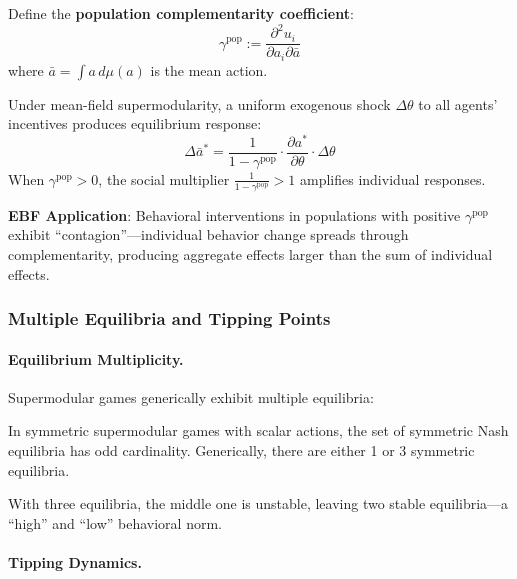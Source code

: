 Define the \textbf{population complementarity coefficient}:
\begin{equation}
\gamma^{\text{pop}} := \frac{\partial^2 u_i}{\partial a_i \partial \bar{a}}
\end{equation}
where $\bar{a} = \int a \, d\mu(a)$ is the mean action.

\begin{proposition}
\label{prop:multiplier}
Under mean-field supermodularity, a uniform exogenous shock $\Delta \theta$ to all 
agents' incentives produces equilibrium response:
\begin{equation}
\Delta \bar{a}^* = \frac{1}{1 - \gamma^{\text{pop}}} \cdot \frac{\partial a^*}{\partial \theta} \cdot \Delta\theta
\end{equation}
When $\gamma^{\text{pop}} > 0$, the social multiplier $\frac{1}{1-\gamma^{\text{pop}}} > 1$ 
amplifies individual responses.
\end{proposition}

\textbf{EBF Application}: Behavioral interventions in populations with positive 
$\gamma^{\text{pop}}$ exhibit ``contagion''---individual behavior change spreads 
through complementarity, producing aggregate effects larger than the sum of 
individual effects.

\subsubsection{Multiple Equilibria and Tipping Points}

\paragraph{Equilibrium Multiplicity.}

Supermodular games generically exhibit multiple equilibria:

\begin{proposition}
\label{prop:eq-structure}
In symmetric supermodular games with scalar actions, the set of symmetric Nash 
equilibria has odd cardinality. Generically, there are either 1 or 3 symmetric 
equilibria.
\end{proposition}

With three equilibria, the middle one is unstable, leaving two stable equilibria---a 
``high'' and ``low'' behavioral norm.

\paragraph{Tipping Dynamics.}

